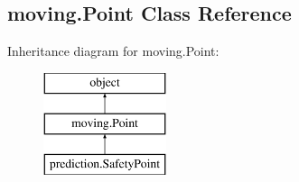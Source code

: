 \hypertarget{classmoving_1_1Point}{\subsection{moving.\-Point Class Reference}
\label{classmoving_1_1Point}
}
Inheritance diagram for moving.\-Point\-:\begin{figure}[H]
\begin{center}
\leavevmode
\includegraphics[height=3.000000cm]{classmoving_1_1Point}
\end{center}
\end{figure}
